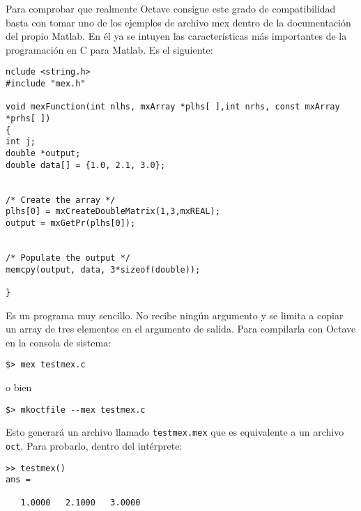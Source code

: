 Para comprobar que realmente Octave consigue este grado de
compatibilidad basta con tomar uno de los ejemplos de archivo mex
dentro de la documentación del propio Matlab.  En él ya se intuyen las
características más importantes de la programación en C para
Matlab. Es el siguiente:

\begin{verbatim}
nclude <string.h>
#include "mex.h"

void mexFunction(int nlhs, mxArray *plhs[ ],int nrhs, const mxArray *prhs[ ])
{
int j;
double *output;
double data[] = {1.0, 2.1, 3.0};


/* Create the array */
plhs[0] = mxCreateDoubleMatrix(1,3,mxREAL);
output = mxGetPr(plhs[0]);


/* Populate the output */
memcpy(output, data, 3*sizeof(double));

}
\end{verbatim}

Es un programa muy sencillo.  No recibe ningún argumento y se limita a
copiar un array de tres elementos en el argumento de
salida. Para compilarla con Octave en la consola de sistema:

\begin{verbatim}
$> mex testmex.c
\end{verbatim}

o bien

\begin{verbatim}
$> mkoctfile --mex testmex.c
\end{verbatim}


Esto generará un archivo llamado \texttt{testmex.mex} que es
equivalente a un archivo \texttt{oct}.  Para probarlo, dentro del
intérprete:

\begin{verbatim}
>> testmex()
ans =

   1.0000   2.1000   3.0000
\end{verbatim}


